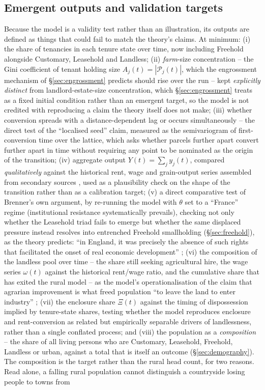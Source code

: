 \documentclass[11pt,english]{article}
\begin{document}
\subsection{Emergent outputs and validation targets}
\label{sec:validation}

Because the model is a validity test rather than an illustration, its outputs are defined as things that could fail to match the theory's claims. At minimum: (i) the share of tenancies in each tenure state over time, now including Freehold alongside Customary, Leasehold and Landless; (ii) \emph{farm}-size concentration -- the Gini coefficient of tenant holding size $A_j(t)=|\mathcal{P}_j(t)|$, which the engrossment mechanism of \S\ref{sec:engrossment} predicts should rise over the run -- kept \emph{explicitly distinct} from landlord-estate-size concentration, which \S\ref{sec:engrossment} treats as a fixed initial condition rather than an emergent target, so the model is not credited with reproducing a claim the theory itself does not make; (iii) whether conversion spreads with a distance-dependent lag or occurs simultaneously -- the direct test of the ``localised seed'' claim, measured as the semivariogram of first-conversion time over the lattice, which asks whether parcels further apart convert further apart in time without requiring any point to be nominated as the origin of the transition; (iv) aggregate output $Y(t)=\sum_j y_j(t)$, compared \emph{qualitatively} against the historical rent, wage and grain-output series assembled from secondary sources \cite{clark1991yields,clark2002land,kerridge1953movement}, used as a plausibility check on the shape of the transition rather than as a calibration target; (v) a direct comparative test of Brenner's own argument, by re-running the model with $\theta$ set to a ``France'' regime (institutional resistance systematically prevails), checking not only whether the Leasehold triad fails to emerge but whether the same displaced pressure instead resolves into entrenched Freehold smallholding (\S\ref{sec:freehold}), as the theory predicts: ``in England, it was precisely the absence of such rights that facilitated the onset of real economic development'' \cite[p.74-75]{brenner1976agrarian}; (vi) the composition of the landless pool over time -- the share still seeking agricultural hire, the wage series $\omega(t)$ against the historical rent/wage ratio, and the cumulative share that has exited the rural model -- as the model's operationalisation of the claim that agrarian improvement is what freed population ``to leave the land to enter industry'' \cite[p.67]{brenner1976agrarian}; (vii) the enclosure share $\Xi(t)$ against the timing of dispossession implied by tenure-state shares, testing whether the model reproduces enclosure and rent-conversion as related but empirically separable drivers of landlessness, rather than a single conflated process; and (viii) the population as a \emph{composition} -- the share of all living persons who are Customary, Leasehold, Freehold, Landless or urban, against a total that is itself an outcome (\S\ref{sec:demography}). The composition is the target rather than the rural head count, for two reasons. Read alone, a falling rural population cannot distinguish a countryside losing people to towns from 
\end{document}
